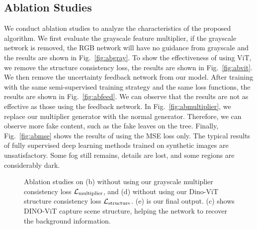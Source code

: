 \documentclass[runningheads]{llncs}
\begin{document}
\subsection{Ablation Studies}
We conduct ablation studies to analyze the characteristics of the proposed algorithm.
We first evaluate the grayscale feature multiplier, if the grayscale network is removed, the RGB network will have no guidance from grayscale and the results are shown in Fig.~\ref{fig:abgray}.
To show the effectiveness of using ViT, we remove the structure consistency loss, the results are shown in Fig.~\ref{fig:abvit}. 
We then remove the uncertainty feedback network from our model. After training with the same semi-supervised training strategy and the same loss functions, the results are shown in Fig.~\ref{fig:abfeed}. 
We can observe that the results are not as effective as those using the feedback network. 
In Fig.~\ref{fig:abmultiplier}, we replace our multiplier generator with the normal generator. 
Therefore, we can observe more fake content, such as the fake leaves on the tree. 
Finally, Fig.~\ref{fig:abmse} shows the results of using the MSE loss only. 
The typical results of fully supervised deep learning methods trained on synthetic images are unsatisfactory. 
Some fog still remains, details are lost, and some regions are considerably dark.

\begin{figure}[t!]
	\centering
	\captionsetup[subfloat]{font=small, labelformat=empty}
	\captionsetup[subfloat]{farskip=1pt}
	\setcounter{subfigure}{0}
	\hfill
	\hfill
	\hfill
	\hfill
	\hfill
	\caption{Ablation studies on (b) without using our grayscale multiplier consistency loss $\mathcal{L}_{\rm multiplier}$, and (d) without using our Dino-ViT structure consistency loss $\mathcal{L}_{\rm structure}$. (e) is our final output. (c) shows DINO-ViT capture scene structure, helping the network to recover the background information.}
	\label{fig:ablation_vit}
\end{figure}
\end{document}
